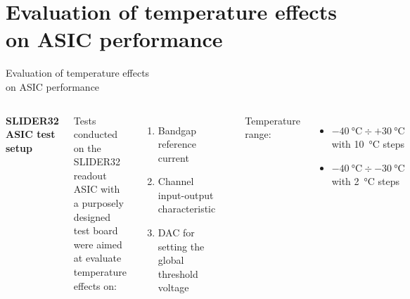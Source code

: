 \documentclass[aspectratio=169,xcolor=dvipsnames]{beamer}
\begin{document}

\section{Evaluation of temperature effects on ASIC performance}

\begin{frame}{Evaluation of temperature effects \\ \vskip-0.15cm on ASIC performance}
\fontsize{8.5pt}{1}\selectfont
    \begin{columns}[T]
        \vskip0.3cm
        \textbf{SLIDER32 ASIC test setup}\\
        \vskip0.15cm
        
        Tests conducted on the SLIDER32 readout ASIC with a purposely designed test board were aimed at evaluate temperature effects on:
        \begin{enumerate}
            \item Bandgap reference current
            \item Channel input-output characteristic
            \item DAC for setting the global threshold voltage
        \end{enumerate}

        \vskip0.05cm
        \includegraphics[width=0.95\textwidth]{images/temperature_effects/test_setup_test_board_csavrefgm_530mv.png}
        \vskip0.2cm

        Temperature range: 
        \begin{itemize}
            \item $\SI{-40}{\celsius} \div +\SI{30}{\celsius}$ with \SI{10}{\celsius} steps
            \item $\SI{-40}{\celsius} \div \SI{-30}{\celsius}$ with \SI{2}{\celsius} steps
        \end{itemize}
 

\end{columns}
\end{frame}
\end{document}
